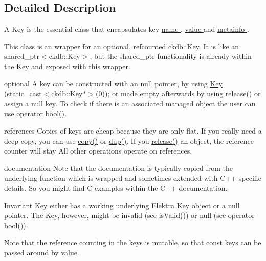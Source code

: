 \subsection{Detailed Description}
A Key is the essential class that encapsulates key \hyperlink{group__keyname}{name }, \hyperlink{group__keyvalue}{value } and \hyperlink{group__keymeta}{metainfo }.  

This class is an wrapper for an optional, refcounted ckdb\-::\-Key. It is like an shared\-\_\-ptr$<$ckdb\-::\-Key$>$, but the shared\-\_\-ptr functionality is already within the \hyperlink{classkdb_1_1Key}{Key} and exposed with this wrapper.

\begin{DoxyParagraph}{optional}
A key can be constructed with an null pointer, by using \hyperlink{classkdb_1_1Key}{Key} (static\-\_\-cast$<$ckdb\-::\-Key$\ast$$>$(0)); or made empty afterwards by using \hyperlink{classkdb_1_1Key_a9ae719043e6e99f5f3d6fb85837306f8}{release()} or assign a null key. To check if there is an associated managed object the user can use operator bool().
\end{DoxyParagraph}
\begin{DoxyParagraph}{references}
Copies of keys are cheap because they are only flat. If you really need a deep copy, you can use \hyperlink{classkdb_1_1Key_ab5bc93e22f4cf40b9d2b1fc32cc260be}{copy()} or \hyperlink{classkdb_1_1Key_a43a1f28d7a0d40f0ded8473d480931ff}{dup()}. If you \hyperlink{classkdb_1_1Key_a9ae719043e6e99f5f3d6fb85837306f8}{release()} an object, the reference counter will stay All other operations operate on references.
\end{DoxyParagraph}
\begin{DoxyParagraph}{documentation}
Note that the documentation is typically copied from the underlying function which is wrapped and sometimes extended with C++ specific details. So you might find C examples within the C++ documentation.
\end{DoxyParagraph}
\begin{DoxyInvariant}{Invariant}
\hyperlink{classkdb_1_1Key}{Key} either has a working underlying Elektra \hyperlink{classkdb_1_1Key}{Key} object or a null pointer. The \hyperlink{classkdb_1_1Key}{Key}, however, might be invalid (see \hyperlink{classkdb_1_1Key_acbb13cfcabb4548177e86eec1ac16d87}{is\-Valid()}) or null (see operator bool()).
\end{DoxyInvariant}
\begin{DoxyNote}{Note}
that the reference counting in the keys is mutable, so that const keys can be passed around by value. 
\end{DoxyNote}


